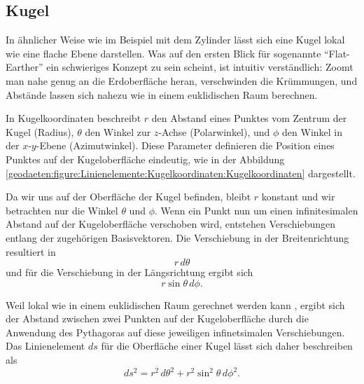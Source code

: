 %
%
%
%
\subsection{Kugel\label{geodaeten:section:Linienelement:Kugel}}

In ähnlicher Weise wie im Beispiel mit dem Zylinder lässt sich eine Kugel lokal wie eine flache Ebene darstellen.
Was auf den ersten Blick für sogenannte ``Flat-Earther'' ein schwieriges Konzept zu sein scheint, ist intuitiv verständlich:
Zoomt man nahe genug an die Erdoberfläche heran, verschwinden die Krümmungen, und Abstände lassen sich nahezu wie in einem euklidischen Raum berechnen.

In Kugelkoordinaten beschreibt $r$ den Abstand eines Punktes vom Zentrum der Kugel (Radius), $\theta$ den Winkel zur $z$-Achse (Polarwinkel), und $\phi$ den Winkel in der $x$-$y$-Ebene (Azimutwinkel).
Diese Parameter definieren die Position eines Punktes auf der Kugeloberfläche eindeutig, wie in der Abbildung \ref{geodaeten:figure:Linienelemente:Kugelkoordinaten:Kugelkoordinaten} dargestellt.

Da wir uns auf der Oberfläche der Kugel befinden, bleibt $r$ konstant und wir betrachten nur die Winkel $\theta$ und $\phi$.
Wenn ein Punkt nun um einen infinitesimalen Abstand auf der Kugeloberfläche verschoben wird, entstehen Verschiebungen entlang der zugehörigen Basisvektoren. 
Die Verschiebung in der Breitenrichtung resultiert in
\begin{equation}
	r \, d\theta
\end{equation}
und für die Verschiebung in der Längsrichtung ergibt sich
\begin{equation}
	r \sin\theta \, d\phi.
\end{equation}

Weil lokal wie in einem euklidischen Raum gerechnet werden kann , ergibt sich der Abstand zwischen zwei Punkten auf der Kugeloberfläche durch die Anwendung des Pythagoras auf diese jeweiligen infinetsimalen Verschiebungen. 
Das Linienelement $ds$ für die Oberfläche einer Kugel lässt sich daher beschreiben als
\begin{equation}
ds^2 = r^2 \, d\theta^2 + r^2 \sin^2\theta \, d\phi^2.
\end{equation}


